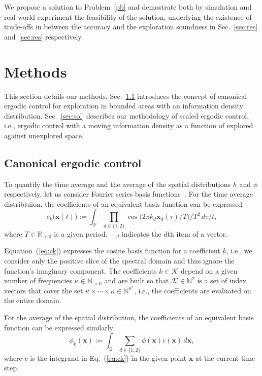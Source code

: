 \documentclass[letterpaper,10pt,conference,twoside]{IEEEtran}
\theoremstyle{definition}
\begin{document}
We propose a solution to Problem~\ref{pb} and demostrate both by simulation and real-world experiment the feasibility of the solution, underlying the existence of trade-offs in between the accuracy and the exploration soundness in Sec.~\ref{sec:res} and~\ref{sec:res} respectively.

\section{Methods}\label{sec:meth}
\noindent
This section details our methods. Sec.~\ref{sec:canon} introduces the concept of canonical ergodic control for exploration in bounded areas with an information density distribution. Sec.~\ref{sec:sol} describes our methodology of scaled ergodic control, i.e., ergodic control with a moving information density as a function of explored against unexplored space.

\subsection{Canonical ergodic control}
\label{sec:canon}
\noindent
To quantify the time average and the average of the spatial distributions $h$ and $\phi$ respectively, let us consider Fourier series basis functions~\cite{TODO}. For the time average distribtuion, the coefficients of an equivalent basis function can be expressed
\begin{equation}\label{eq:ck}
  c_k\big(\mathbf{x}(t)\big):=\int_{\mathcal{T}}{\prod_{d\in\{1,2\}}}{\cos{\big(2\pi k_d\mathbf{x}_d(\tau)/T\big)}/T^2}\,d\tau/t,
\end{equation}
where $T\in\mathbb{R}_{>0}$ is a given period. $\,\cdot\,_d$ indicates the $d$th item of a vector. %

Equation~(\ref{eq:ck}) expresses the cosine basis function for a coefficient $k$, i.e., we consider only the positive slice of the spectral domain and thus ignore the function's imaginary component. The coefficients $k\in\mathcal{K}$ depend on a given number of frequencies $\kappa\in\mathbb{N}_{>0}$ and are built so that $\mathcal{K}\in\mathbb{N}^2$ is a set of index vectors that cover the set $\kappa\times\cdots\times\kappa\in\mathbb{N}^{\kappa^2}$, i.e., the coefficients are evaluated on the entire domain.

For the average of the spatial distribution, the coefficients of an equivalent basis function can be expressed similarly
\begin{equation}\label{eq:phik}
  \phi_k(\mathbf{x}):=\int_{\mathcal{Q}}{\sum_{d\in\{1,2\}}}{\phi(\mathbf{x})c(\mathbf{x})\,d\mathbf{x}},
\end{equation}
where $c$ is the integrand in Eq.~(\ref{eq:ck}) in the given point $\mathbf{x}$ at the current time step.
\end{document}
